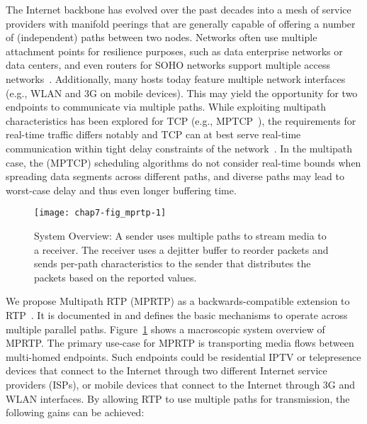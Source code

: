 The Internet backbone has evolved over the past decades into a mesh of service
providers with manifold peerings that are generally capable of offering a
number of (independent) paths between two nodes. Networks often use multiple
attachment points for resilience purposes, such as data enterprise networks or
data centers, and even routers for SOHO networks support multiple access
networks~\cite{draft.fun.multi, draft.homenet.arch}. Additionally, many hosts
today feature multiple network interfaces (e.g., WLAN and 3G on mobile
devices). This may yield the opportunity for two endpoints to communicate via
multiple paths. While exploiting multipath characteristics
\cite{Wischik:2008:RPP} has been explored for TCP (e.g.,
MPTCP~\cite{wischik:2011nsdi,rfc6824}), the requirements for real-time traffic differs notably
and TCP can at best serve real-time communication within tight delay
constraints of the network~\cite{Brosh:tcp-real-time}. In the multipath case,
the (MPTCP) scheduling algorithms do not consider real-time bounds when spreading data
segments across different paths, and diverse paths may lead to worst-case delay
and thus even longer buffering time.

\begin{figure}[!t]
\centerline {
\texttt{[image: chap7-fig\_mprtp-1]}
}
\caption{System Overview: A sender uses multiple paths to stream media
  to a receiver.  The receiver uses a dejitter buffer to reorder
  packets and sends per-path characteristics to the sender that
  distributes the packets based on the reported values.}
\label{chap7:fig_mprtp}
\end{figure}

We propose Multipath RTP (MPRTP) as a backwards-compatible extension to
RTP~\cite{rfc3550}. It is documented in \cite{draft.mprtp} and defines the
basic mechanisms to operate across multiple parallel paths.
Figure~\ref{chap7:fig_mprtp} shows a macroscopic system overview of MPRTP. The
primary use-case for MPRTP is transporting media flows between multi-homed
endpoints. Such endpoints could be residential IPTV or telepresence devices
that connect to the Internet through two different Internet service providers
(ISPs), or mobile devices that connect to the Internet through 3G and WLAN
interfaces. By allowing RTP to use multiple paths for transmission, the
following gains can be achieved:

